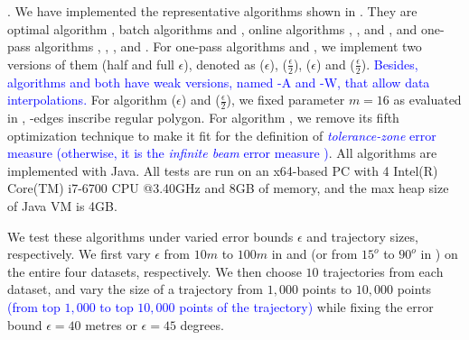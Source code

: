 

.
We have implemented the representative algorithms shown in .
 They are optimal algorithm \opt, batch algorithms \dpa and \tpa, online algorithms  \opwa, \bqsa, \squishe and \myblue{\dagots}, and one-pass algorithms  \operb, \siped, \cised, \intersec and \interval.
For one-pass algorithms \siped and \cised, we implement two versions of them (half and full $\epsilon$), denoted as \siped($\epsilon$), \siped($\frac{\epsilon}{2}$), \cised($\epsilon$) and \cised($\frac{\epsilon}{2}$). 
\textcolor{blue}{Besides, algorithms \operb\cite{Lin:Operb} and \cised\cite{Lin:Cised} both have weak versions, named \operb-A and \cised-W, that allow data interpolations. } %
For algorithm \cised($\epsilon$) and \cised($\frac{\epsilon}{2}$), we fixed parameter $m=16$ as evaluated in \cite{Lin:Cised}, -edges inscribe regular polygon.
{For algorithm \operb, we remove its fifth optimization technique to make it fit for the definition of \textcolor{blue}{\emph{tolerance-zone} error measure \cite{Daescu:metric,Barequet:3D,Chen:Space,Imai:Optimal,Melkman:Optimal} (otherwise, it is the \emph{infinite beam} error measure \cite{Daescu:metric,Chen:Space})}.}
All algorithms are implemented with Java.
{All tests are run on an x64-based  PC with 4 Intel(R) Core(TM) {i7-6700 CPU @3.40GHz} and 8GB of memory, and {the max heap size of Java VM is 4GB.}}


We test these algorithms under varied error bounds $\epsilon$ and trajectory sizes, respectively. We first vary $\epsilon$ from $10m$ to $100m$ in \ped and \sed (or from $15^o$ to $90^o$ in \dad) on the entire four datasets, respectively. We then choose $10$ trajectories from each dataset, and vary the size  of a trajectory from $1,000$ points to $10,000$ points \textcolor{blue}{(\ie from top $1,000$ to top $10,000$ points of the trajectory)} while fixing the error bound $\epsilon=40$ metres or $\epsilon=45$ degrees.

